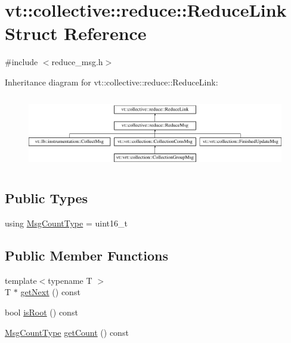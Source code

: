 \hypertarget{structvt_1_1collective_1_1reduce_1_1_reduce_link}{}\section{vt\+:\+:collective\+:\+:reduce\+:\+:Reduce\+Link Struct Reference}
\label{structvt_1_1collective_1_1reduce_1_1_reduce_link}


{\ttfamily \#include $<$reduce\+\_\+msg.\+h$>$}

Inheritance diagram for vt\+:\+:collective\+:\+:reduce\+:\+:Reduce\+Link\+:\begin{figure}[H]
\begin{center}
\leavevmode
\includegraphics[height=3.218391cm]{structvt_1_1collective_1_1reduce_1_1_reduce_link}
\end{center}
\end{figure}
\subsection*{Public Types}
\begin{DoxyCompactItemize}
\item 
using \hyperlink{structvt_1_1collective_1_1reduce_1_1_reduce_link_a041d928748b444f18ea3ddb72fdbe08a}{Msg\+Count\+Type} = uint16\+\_\+t
\end{DoxyCompactItemize}
\subsection*{Public Member Functions}
\begin{DoxyCompactItemize}
\item 
{\footnotesize template$<$typename T $>$ }\\T $\ast$ \hyperlink{structvt_1_1collective_1_1reduce_1_1_reduce_link_a5f2fa0112fe80ef48b561e2208f92096}{get\+Next} () const
\item 
bool \hyperlink{structvt_1_1collective_1_1reduce_1_1_reduce_link_ac7acf00f0be6c8e12bdf4f5ad2268c3e}{is\+Root} () const
\item 
\hyperlink{structvt_1_1collective_1_1reduce_1_1_reduce_link_a041d928748b444f18ea3ddb72fdbe08a}{Msg\+Count\+Type} \hyperlink{structvt_1_1collective_1_1reduce_1_1_reduce_link_ad182794660d06139bbc59f85151cb27b}{get\+Count} () const
\end{DoxyCompactItemize}
